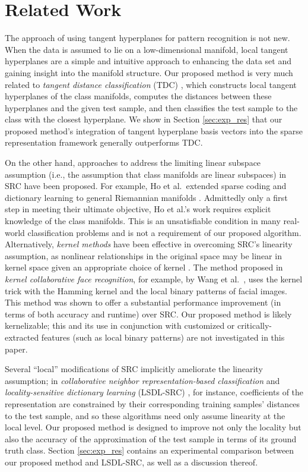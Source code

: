 \documentclass[review]{elsarticle}
\begin{document}
\section{Related Work} \label{sec:rw}

The approach of using tangent hyperplanes for pattern recognition is not new. When the data is assumed to lie on a low-dimensional manifold, local tangent hyperplanes are a simple and intuitive approach to enhancing the data set and gaining insight into the manifold structure. Our proposed method is very much related to \emph{tangent distance classification} (TDC) \cite{sim:tdc,cha:tdc,yan:ltd}, which constructs local tangent hyperplanes of the class manifolds, computes the distances between these hyperplanes and the given test sample, and then classifies the test sample to the class with the closest hyperplane. We show in Section \ref{sec:exp_res} that our proposed method's integration of tangent hyperplane basis vectors into the sparse representation framework generally outperforms TDC.

On the other hand, approaches to address the limiting linear subspace assumption (i.e., the assumption that class manifolds are linear subspaces) in SRC have been proposed. For example, Ho et al.\ extended sparse coding and dictionary learning to general Riemannian manifolds \cite{xie:nlsrc}. Admittedly only a first step in meeting their ultimate objective, Ho et al.'s work requires explicit knowledge of the class manifolds. This is an unsatisfiable condition in many real-world classification problems and is not a requirement of our proposed algorithm. Alternatively, \emph{kernel methods} have been effective in overcoming SRC's linearity assumption, as nonlinear relationships in the original space may be linear in kernel space given an appropriate choice of kernel \cite{yin:ksrc}. The method proposed in \emph{kernel collaborative face recognition}, for example, by Wang et al.\ \cite{wan:kcfr}, uses the kernel trick with the Hamming kernel and the local binary patterns of facial images. This method was shown to offer a substantial performance improvement (in terms of both accuracy and runtime) over SRC. Our proposed method is likely kernelizable; this and its use in conjunction with customized or critically-extracted features (such as local binary patterns) are not investigated in this paper.
 
Several ``local'' modifications of SRC implicitly ameliorate the linearity assumption; in \emph{collaborative neighbor representation-based classification} \cite{waq:cnrc} and \emph{locality-sensitive dictionary learning} (LSDL-SRC) \cite{wei:lsdl}, for instance, coefficients of the representation are constrained by their corresponding training samples' distances to the test sample, and so these algorithms need only assume linearity at the local level. Our proposed method is designed to improve not only the locality but also the accuracy of the approximation of the test sample in terms of its ground truth class. Section \ref{sec:exp_res} contains an experimental comparison between our proposed method and LSDL-SRC, as well as a discussion thereof.
\end{document}
